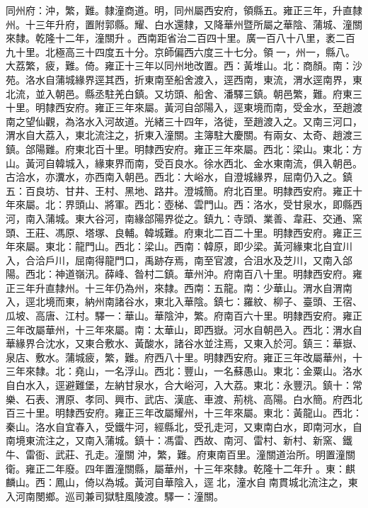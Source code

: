 \begin{pinyinscope}
同州府：沖，繁，難。隸潼商道。明，同州屬西安府，領縣五。雍正三年，升直隸州。十三年升府，置附郭縣。耀、白水還隸，又降華州暨所屬之華陰、蒲城、潼關來隸。乾隆十二年，潼關升。西南距省治二百四十里。廣一百八十八里，袤二百九十里。北極高三十四度五十分。京師偏西六度三十七分。領一，州一，縣八。大荔繁，疲，難。倚。雍正十三年以同州地改置。西：黃堆山。北：商顏。南：沙苑。洛水自蒲城緣界逕其西，折東南至船舍渡入，逕西南，東流，渭水逕南界，東北流，並入朝邑。縣丞駐羌白鎮。又坊頭、船舍、潘驛三鎮。朝邑繁，難。府東三十里。明隸西安府。雍正三年來屬。黃河自郃陽入，逕東境而南，受金水，至趙渡南之望仙觀，為洛水入河故道。光緒三十四年，洛徙，至趙渡入之。又南三河口，渭水自大荔入，東北流注之，折東入潼關。主簿駐大慶關。有兩女、太奇、趙渡三鎮。郃陽難。府東北百十里。明隸西安府。雍正三年來屬。西北：梁山。東北：方山。黃河自韓城入，緣東界而南，受百良水。徐水西北、金水東南流，俱入朝邑。古洽水，亦瀵水，亦西南入朝邑。西北：大峪水，自澄城緣界，屈南仍入之。鎮五：百良坊、甘井、王村、黑地、路井。澄城簡。府北百里。明隸西安府。雍正十年來屬。北：界頭山、將軍。西北：壺梯、雲門山。西：洛水，受甘泉水，即縣西河，南入蒲城。東大谷河，南緣郃陽界從之。鎮九：寺頭、業善、韋莊、交通、窯頭、王莊、馮原、塔塚、良輔。韓城難。府東北二百二十里。明隸西安府。雍正三年來屬。東北：龍門山。西北：梁山。西南：韓原，即少梁。黃河緣東北自宜川入，合洽戶川，屈南得龍門口，禹跡存焉，南至官渡，合沮水及芝川，又南入郃陽。西北：神道嶺汛。薛峰、昝村二鎮。華州沖。府南百八十里。明隸西安府。雍正三年升直隸州。十三年仍為州，來隸。西南：五龍。南：少華山。渭水自渭南入，逕北境而東，納州南諸谷水，東北入華陰。鎮七：羅紋、柳子、臺頭、王宿、瓜坡、高唐、江村。驛一：華山。華陰沖，繁。府南百六十里。明隸西安府。雍正三年改屬華州，十三年來屬。南：太華山，即西嶽。河水自朝邑入。西北：渭水自華緣界合沈水，又東合敷水、黃酸水，諸谷水並注焉，又東入於河。鎮三：華嶽、泉店、敷水。蒲城疲，繁，難。府西八十里。明隸西安府。雍正三年改屬華州，十三年來隸。北：堯山，一名浮山。西北：豐山，一名蘇愚山。東北：金粟山。洛水自白水入，逕避難堡，左納甘泉水，合大峪河，入大荔。東北：永豐汛。鎮十：常樂、石表、渭原、孝同、興市、武店、漢底、車渡、荊桃、高陽。白水簡。府西北百三十里。明隸西安府。雍正三年改屬耀州，十三年來屬。東北：黃龍山。西北：秦山。洛水自宜春入，受鐵牛河，經縣北，受孔走河，又東南白水，即南河水，自南境東流注之，又南入蒲城。鎮十：馮雷、西故、南河、雷村、新村、新窯、鐵牛、雷衙、武莊、孔走。潼關沖，繁，難。府東南百里。潼關道治所。明置潼關衛。雍正二年廢。四年置潼關縣，屬華州，十三年來隸。乾隆十二年升。東：麒麟山。西：鳳山，倚以為城。黃河自華陰入，逕北，潼水自南貫城北流注之，東入河南閿鄉。巡司兼司獄駐風陵渡。驛一：潼關。


\end{pinyinscope}
